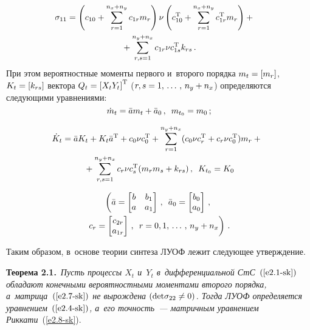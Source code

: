 \begin{multicols}{2}
\noindent
\begin{multline*}
\hspace*{-9.60526pt}\sigma_{11}= \left( c_{10} +\sss_{r=1}^{n_x+n_y} c_{1r} m_{r}\right) \nu
     \left( c_{10}^{\mathrm{T}} +\sss_{r=1}^{n_x+n_y} c_{1r}^{\mathrm{T}} m_{r}\right)+{}\\
{}+\sss_{r,s=1}^{n_y+n_x} c_{1r}\nu c_{1s}^{\mathrm{T}} k_{rs}\,. %
\end{multline*}
При этом вероятностные моменты первого и~второго порядка
$m_t \hm=\lk m_r\rk$, $K_t \hm=\lk k_{rs}\rk$ вектора
$Q_t \hm= \lk X_t Y_t\rk^{\mathrm{T}}$ ($r, s \hm=1\tr n_y+n_x$)
определяются следующими уравнениями:
\begin{equation}
\dot m_t = \bar a m_t+\bar a_0\,,\enskip m_{t_0}= m_0\,;\label{e2.11-sk}
\end{equation}

\vspace*{-14pt}

\noindent
\begin{multline}
\hspace*{-4.38786pt}\dot K_t = \bar a K_t + K_t \bar a^{\mathrm{T}} + c_0\nu c_0^{\mathrm{T}} +\sum\limits_{r=1}^{n_y+n_x}
 (c_0\nu c_r^{\mathrm{T}} + c_r \nu c_0^{\mathrm{T}})m_r+{}\\
{}+ \sum\limits_{r,s=1}^{n_y+n_x} c_r \nu c_s^{\mathrm{T}} (m_rm_s + k_{rs})\,,
\enskip K_{t_0}=K_0\label{e2.12-sk}
\end{multline}


\vspace*{-14pt}

\noindent
\begin{multline*}
\left(\bar a=\begin{bmatrix}
b&b_{1}\\
a&a_{1}\end{bmatrix}\,,\enskip
\bar a_0= \begin{bmatrix}
b_{0}\\
a_{0}\end{bmatrix}\,,\right.\\
\left.c_r = \begin{bmatrix}
c_{2r}\\ a_{1r}
\end{bmatrix}\,,\enskip r=0,1,\,\ldots\,,\, n_y+n_x\right)\,.
\end{multline*}

Таким образом, в~основе теории синтеза  ЛУОФ лежит следующее утверждение.

\smallskip

\noindent
\textbf{Теорема 2.1.}\ \textit{Пусть процессы $X_t$ и~$Y_t$
в~дифференциальной СтС~$(\ref{e2.1-sk})$
обладают конечными вероятностными моментами  второго порядка,
а~матрица~$(\ref{e2.7-sk})$ не вырождена  $(\mathrm{det} \sigma_{22} \hm\ne 0)$.
Тогда  ЛУОФ определяется уравнением~$(\ref{e2.4-sk})$,
а~его точность~--- матричным уравнением Риккати}~(\ref{e2.8-sk}).


\end{multicols}
